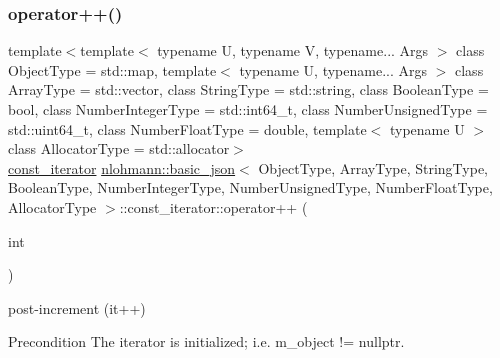 \subsubsection{\texorpdfstring{operator++()}{operator++()}\hspace{0.1cm}{\footnotesize\ttfamily [1/2]}}
{\footnotesize\ttfamily template$<$template$<$ typename U, typename V, typename... Args $>$ class Object\+Type = std\+::map, template$<$ typename U, typename... Args $>$ class Array\+Type = std\+::vector, class String\+Type  = std\+::string, class Boolean\+Type  = bool, class Number\+Integer\+Type  = std\+::int64\+\_\+t, class Number\+Unsigned\+Type  = std\+::uint64\+\_\+t, class Number\+Float\+Type  = double, template$<$ typename U $>$ class Allocator\+Type = std\+::allocator$>$ \\
\hyperlink{classnlohmann_1_1basic__json_1_1const__iterator}{const\+\_\+iterator} \hyperlink{classnlohmann_1_1basic__json}{nlohmann\+::basic\+\_\+json}$<$ Object\+Type, Array\+Type, String\+Type, Boolean\+Type, Number\+Integer\+Type, Number\+Unsigned\+Type, Number\+Float\+Type, Allocator\+Type $>$\+::const\+\_\+iterator\+::operator++ (\begin{DoxyParamCaption}\item[{int}]{ }\end{DoxyParamCaption})\hspace{0.3cm}{\ttfamily [inline]}}



post-\/increment (it++) 

\begin{DoxyPrecond}{Precondition}
The iterator is initialized; i.\+e. {\ttfamily m\+\_\+object != nullptr}. 
\end{DoxyPrecond}
\mbox{\label{classnlohmann_1_1basic__json_1_1const__iterator_a8fbb15efd97599209a7def77af8e748e}} 
